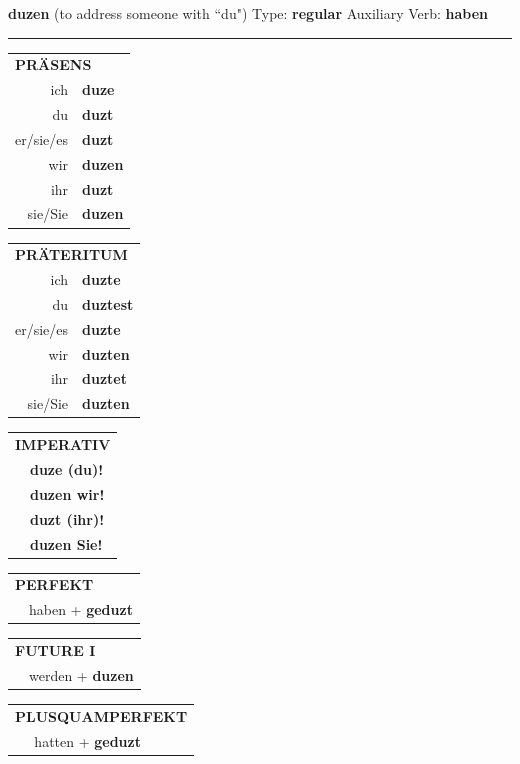 \documentclass[10pt,a4paper]{revtex4-2}
\begin{document}
\begin{verbbox}
{\Large \bf duzen} (to address someone with ``du") \hfill Type: \textbf{regular} \hfill Auxiliary Verb: \textbf{haben}

\vspace{5pt}
\hrule
\vspace{5pt}

\begin{tabular}{rl}
\multicolumn{2}{l}{\textbf{PRÄSENS}}\\
ich & \textbf{duze}\\
du & \textbf{duzt}\\
er/sie/es & \textbf{duzt}\\
wir & \textbf{duzen}\\
ihr & \textbf{duzt}\\
sie/Sie & \textbf{duzen}\\
\end{tabular}
\hfill
\begin{tabular}{rl}
\multicolumn{2}{l}{\textbf{PRÄTERITUM}}\\
ich & \textbf{duzte}\\
du & \textbf{duztest}\\
er/sie/es & \textbf{duzte}\\
wir & \textbf{duzten}\\
ihr & \textbf{duztet}\\
sie/Sie & \textbf{duzten}\\
\end{tabular}
\hfill
\begin{tabular}{rl}
\multicolumn{2}{l}{\textbf{IMPERATIV}}\\
& \textbf{duze (du)!}\\
& \textbf{duzen wir!}\\
& \textbf{duzt (ihr)!}\\
& \textbf{duzen Sie!}\\
\end{tabular}

\vspace{10pt}

\begin{tabular}{rl}
\multicolumn{2}{l}{\textbf{PERFEKT}}\\
& haben + \textbf{geduzt}\\
\end{tabular}
\hfill
\begin{tabular}{rl}
\multicolumn{2}{l}{\textbf{FUTURE I}}\\
& werden + \textbf{duzen}\\
\end{tabular}
\hfill
\begin{tabular}{rl}
\multicolumn{2}{l}{\textbf{PLUSQUAMPERFEKT}}\\
& hatten + \textbf{geduzt}\\
\end{tabular}


\end{verbbox}
\end{document}
